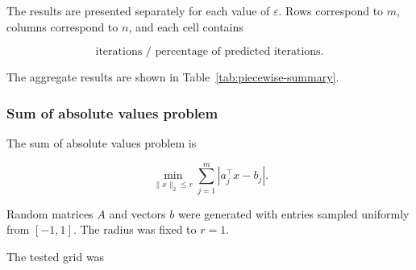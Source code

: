 \documentclass[11pt]{article}
\begin{document}
The results are presented separately for each value of \(\varepsilon\). Rows
correspond to \(m\), columns correspond to \(n\), and each cell contains

\[
    \text{iterations / percentage of predicted iterations}.
\]

\begin{table}[H]
    \centering
    
    \caption{Maximum of absolute values results for $\varepsilon=0.01$.
    Each cell shows iterations / percentage of predicted iterations.}
    \label{tab:piecewise-eps-001}
\end{table}

\begin{table}[H]
    \centering
    
    \caption{Maximum of absolute values results for $\varepsilon=0.001$.
    Each cell shows iterations / percentage of predicted iterations.}
    \label{tab:piecewise-eps-0001}
\end{table}

\begin{table}[H]
    \centering
    
    \caption{Maximum of absolute values results for $\varepsilon=0.0001$.
    Each cell shows iterations / percentage of predicted iterations.}
    \label{tab:piecewise-eps-00001}
\end{table}

The aggregate results are shown in Table~\ref{tab:piecewise-summary}.

\begin{table}[H]
    \centering
    
    \caption{Summary of maximum of absolute values experiments.}
    \label{tab:piecewise-summary}
\end{table}


\subsubsection{Sum of absolute values problem}

The sum of absolute values problem is

\[
    \min_{\|x\|_2\le r}
    \sum_{j=1}^m |a_j^\top x-b_j|.
\]

Random matrices \(A\) and vectors \(b\) were generated with entries sampled
uniformly from \([-1,1]\). The radius was fixed to \(r=1\).

The tested grid was
\end{document}
